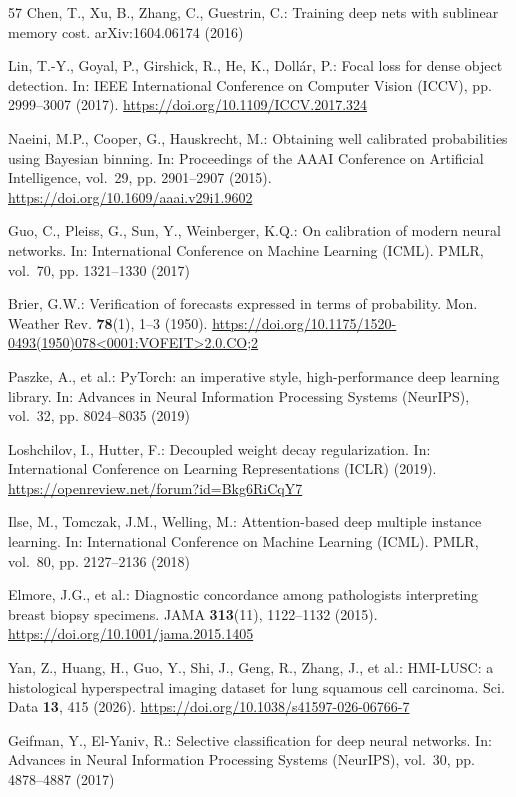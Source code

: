 \documentclass{svproc}
\begin{document}
\begin{thebibliography}{57}
Chen, T., Xu, B., Zhang, C., Guestrin, C.: Training deep nets with sublinear memory cost. arXiv:1604.06174 (2016)

Lin, T.-Y., Goyal, P., Girshick, R., He, K., Doll\'{a}r, P.: Focal loss for dense object detection. In: IEEE International Conference on Computer Vision (ICCV), pp. 2999--3007 (2017). \url{https://doi.org/10.1109/ICCV.2017.324}

Naeini, M.P., Cooper, G., Hauskrecht, M.: Obtaining well calibrated probabilities using Bayesian binning. In: Proceedings of the AAAI Conference on Artificial Intelligence, vol.~29, pp. 2901--2907 (2015). \url{https://doi.org/10.1609/aaai.v29i1.9602}

Guo, C., Pleiss, G., Sun, Y., Weinberger, K.Q.: On calibration of modern neural networks. In: International Conference on Machine Learning (ICML). PMLR, vol.~70, pp. 1321--1330 (2017)

Brier, G.W.: Verification of forecasts expressed in terms of probability. Mon. Weather Rev. \textbf{78}(1), 1--3 (1950). \url{https://doi.org/10.1175/1520-0493(1950)078<0001:VOFEIT>2.0.CO;2}

Paszke, A., et al.: PyTorch: an imperative style, high-performance deep learning library. In: Advances in Neural Information Processing Systems (NeurIPS), vol.~32, pp. 8024--8035 (2019)

Loshchilov, I., Hutter, F.: Decoupled weight decay regularization. In: International Conference on Learning Representations (ICLR) (2019). \url{https://openreview.net/forum?id=Bkg6RiCqY7}

Ilse, M., Tomczak, J.M., Welling, M.: Attention-based deep multiple instance learning. In: International Conference on Machine Learning (ICML). PMLR, vol.~80, pp. 2127--2136 (2018)

Elmore, J.G., et al.: Diagnostic concordance among pathologists interpreting breast biopsy specimens. JAMA \textbf{313}(11), 1122--1132 (2015). \url{https://doi.org/10.1001/jama.2015.1405}

Yan, Z., Huang, H., Guo, Y., Shi, J., Geng, R., Zhang, J., et al.: HMI-LUSC: a histological hyperspectral imaging dataset for lung squamous cell carcinoma. Sci. Data \textbf{13}, 415 (2026). \url{https://doi.org/10.1038/s41597-026-06766-7}

Geifman, Y., El-Yaniv, R.: Selective classification for deep neural networks. In: Advances in Neural Information Processing Systems (NeurIPS), vol.~30, pp. 4878--4887 (2017)


\end{thebibliography}
\end{document}
